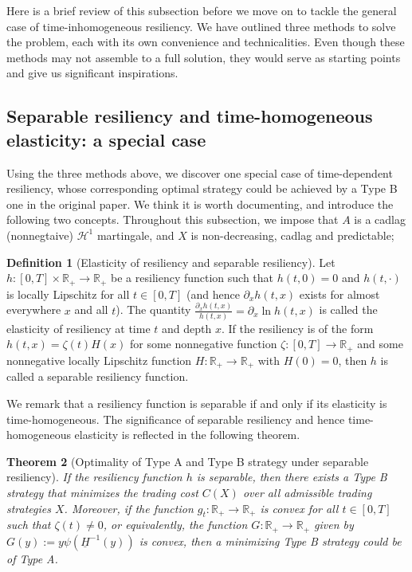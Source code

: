 \documentclass[openany,oneside]{article}
\newtheorem{thm}{Theorem}[section]
\theoremstyle{definition}
\newtheorem{defn}[thm]{Definition}
\theoremstyle{remark}
\begin{document}
Here is a brief review of this subsection before we move on to tackle the general case of time-inhomogeneous resiliency. We have outlined three methods to solve the problem, each with its own convenience and technicalities. Even though these methods may not assemble to a full solution, they would serve as starting points and give us significant inspirations.


\subsection{Separable resiliency and time-homogeneous elasticity: a special case}
Using the three methods above, we discover one special case of time-dependent resiliency, whose corresponding optimal strategy could be achieved by a Type B one in the original paper. We think it is worth documenting, and introduce the following two concepts. Throughout this subsection, we impose that $A$ is a cadlag (nonnegtaive) $\mathcal{H}^1$ martingale, and $X$ is non-decreasing, cadlag and predictable;

\begin{defn}[Elasticity of resiliency and separable resiliency]
Let $h:[0,T]\times \mathbb{R}_+ \to \mathbb{R}_+$ be a resiliency function such that $h(t,0)=0$ and $h(t,\cdot)$ is locally Lipschitz for all $t\in[0,T]$ (and hence $\partial_x h(t,x)$ exists for almost everywhere $x$ and all $t$). The quantity $\frac{\partial_x h(t,x)}{h(t,x)} = \partial_x \ln h(t,x)$ is called the elasticity of resiliency at time $t$ and depth $x$. If the resiliency is of the form $h(t,x) = \zeta(t) H(x)$ for some nonnegative function $\zeta:[0,T] \to \mathbb{R}_+$ and some nonnegative locally Lipschitz function $H:\mathbb{R}_+ \to \mathbb{R}_+$ with $H(0)=0$, then $h$ is called a separable resiliency function.
\end{defn}

We remark that a resiliency function is separable if and only if its elasticity is time-homogeneous. The significance of separable resiliency and hence time-homogeneous elasticity is reflected in the following theorem.

\begin{thm}[Optimality of Type A and Type B strategy under separable resiliency]
If the resiliency function $h$ is separable, then there exists a Type B strategy that minimizes the trading cost $C(X)$ over all admissible trading strategies $X$. Moreover, if the function $g_t:\mathbb{R}_+ \to \mathbb{R}_+$ is convex for all $t\in [0,T]$ such that $\zeta(t)\ne 0$, or equivalently, the function $G:\mathbb{R}_+ \to \mathbb{R}_+$ given by $G(y):= y \psi(\underline{H}^{-1}(y))$ is convex, then a minimizing Type B strategy could be of Type A.
\end{thm}
\end{document}
